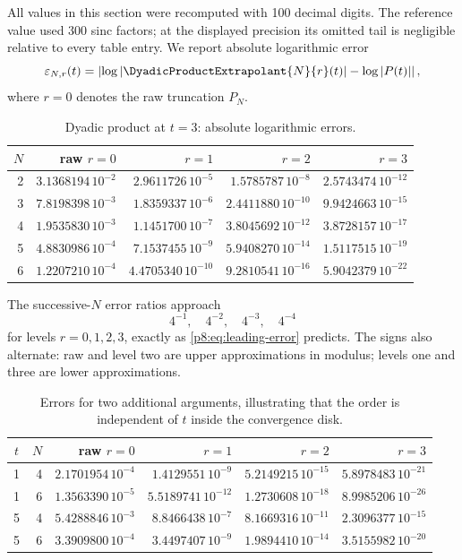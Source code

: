 \documentclass[11pt]{article}
\numberwithin{equation}{section}
\theoremstyle{definition}
\theoremstyle{remark}
\begin{document}
All values in this section were recomputed with 100 decimal digits. The reference value used 300 sinc factors; at the displayed precision its omitted tail is negligible relative to every table entry. We report absolute logarithmic error
\[
\varepsilon_{N,r}(t)=
\left|\log|\DyadicProductExtrapolant{N}{r}(t)|-\log|P(t)|\right|,
\]
where $r=0$ denotes the raw truncation $P_N$.

\begin{table}[htbp]
\centering
\caption{Dyadic product at $t=3$: absolute logarithmic errors.}
\label{p8:tab:numeric-t3}
\begin{tabular}{@{}r r r r r@{}}
\toprule
$N$ & raw $r=0$ & $r=1$ & $r=2$ & $r=3$ \\
\midrule
2 & $3.1368194\,10^{-2}$ & $2.9611726\,10^{-5}$ & $1.5785787\,10^{-8}$ & $2.5743474\,10^{-12}$ \\
3 & $7.8198398\,10^{-3}$ & $1.8359337\,10^{-6}$ & $2.4411880\,10^{-10}$ & $9.9424663\,10^{-15}$ \\
4 & $1.9535830\,10^{-3}$ & $1.1451700\,10^{-7}$ & $3.8045692\,10^{-12}$ & $3.8728157\,10^{-17}$ \\
5 & $4.8830986\,10^{-4}$ & $7.1537455\,10^{-9}$ & $5.9408270\,10^{-14}$ & $1.5117515\,10^{-19}$ \\
6 & $1.2207210\,10^{-4}$ & $4.4705340\,10^{-10}$ & $9.2810541\,10^{-16}$ & $5.9042379\,10^{-22}$ \\
\bottomrule
\end{tabular}
\end{table}

The successive-$N$ error ratios approach
\[
4^{-1},\quad4^{-2},\quad4^{-3},\quad4^{-4}
\]
for levels $r=0,1,2,3$, exactly as \cref{p8:eq:leading-error} predicts. The signs also alternate: raw and level two are upper approximations in modulus; levels one and three are lower approximations.

\begin{table}[htbp]
\centering
\caption{Errors for two additional arguments, illustrating that the order is independent of $t$ inside the convergence disk.}
\label{p8:tab:numeric-other}
\begin{tabular}{@{}c r r r r r@{}}
\toprule
$t$ & $N$ & raw $r=0$ & $r=1$ & $r=2$ & $r=3$ \\
\midrule
1 & 4 & $2.1701954\,10^{-4}$ & $1.4129551\,10^{-9}$ & $5.2149215\,10^{-15}$ & $5.8978483\,10^{-21}$ \\
1 & 6 & $1.3563390\,10^{-5}$ & $5.5189741\,10^{-12}$ & $1.2730608\,10^{-18}$ & $8.9985206\,10^{-26}$ \\
5 & 4 & $5.4288846\,10^{-3}$ & $8.8466438\,10^{-7}$ & $8.1669316\,10^{-11}$ & $2.3096377\,10^{-15}$ \\
5 & 6 & $3.3909800\,10^{-4}$ & $3.4497407\,10^{-9}$ & $1.9894410\,10^{-14}$ & $3.5155982\,10^{-20}$ \\
\bottomrule
\end{tabular}
\end{table}
\end{document}
